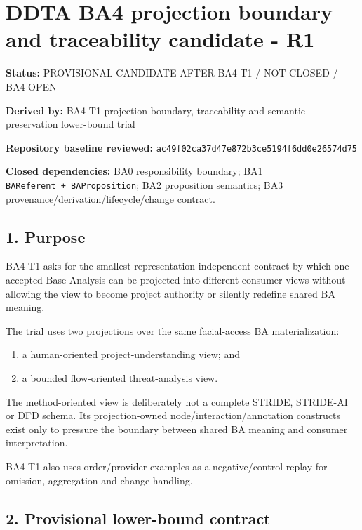 \documentclass[11pt,a4paper]{article}
\providecommand{\tightlist}{\setlength{\itemsep}{0pt}\setlength{\parskip}{0pt}}
\begin{document}
\section{DDTA BA4 projection boundary and traceability candidate - R1}\label{ddta-ba4-projection-boundary-and-traceability-candidate---r1}

\textbf{Status:} PROVISIONAL CANDIDATE AFTER BA4-T1 / NOT CLOSED / BA4 OPEN

\textbf{Derived by:} BA4-T1 projection boundary, traceability and semantic-preservation lower-bound trial

\textbf{Repository baseline reviewed:} \texttt{ac49f02ca37d47e872b3ce5194f6dd0e26574d75}

\textbf{Closed dependencies:} BA0 responsibility boundary; BA1 \texttt{BAReferent\ +\ BAProposition}; BA2 proposition semantics; BA3 provenance/derivation/lifecycle/change contract.

\subsection{1. Purpose}\label{1-purpose}

BA4-T1 asks for the smallest representation-independent contract by which one accepted Base Analysis can be projected into different consumer views without allowing the view to become project authority or silently redefine shared BA meaning.

The trial uses two projections over the same facial-access BA materialization:

\begin{enumerate}
\def\labelenumi{\arabic{enumi}.}
\tightlist
\item
  a human-oriented project-understanding view; and
\item
  a bounded flow-oriented threat-analysis view.
\end{enumerate}

The method-oriented view is deliberately not a complete STRIDE, STRIDE-AI or DFD schema. Its projection-owned node/interaction/annotation constructs exist only to pressure the boundary between shared BA meaning and consumer interpretation.

BA4-T1 also uses order/provider examples as a negative/control replay for omission, aggregation and change handling.

\subsection{2. Provisional lower-bound contract}\label{2-provisional-lower-bound-contract}
\end{document}
